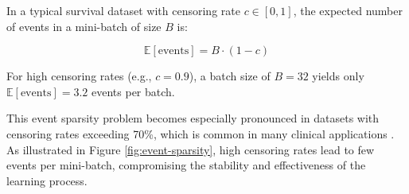 \begin{definitionbox}[title=Event Sparsity in Mini-Batches]
  In a typical survival dataset with censoring rate $c \in [0,1]$, the expected number of events in a mini-batch of size $B$ is:

  \begin{equation}
    \mathbb{E}[\text{events}] = B \cdot (1 - c)
  \end{equation}

  For high censoring rates (e.g., $c = 0.9$), a batch size of $B = 32$ yields only $\mathbb{E}[\text{events}] = 3.2$ events per batch.
\end{definitionbox}

This event sparsity problem becomes especially pronounced in datasets with censoring rates exceeding 70\%, which is common in many clinical applications \parencite{ranganath2016}. As illustrated in Figure \ref{fig:event-sparsity}, high censoring rates lead to few events per mini-batch, compromising the stability and effectiveness of the learning process.

